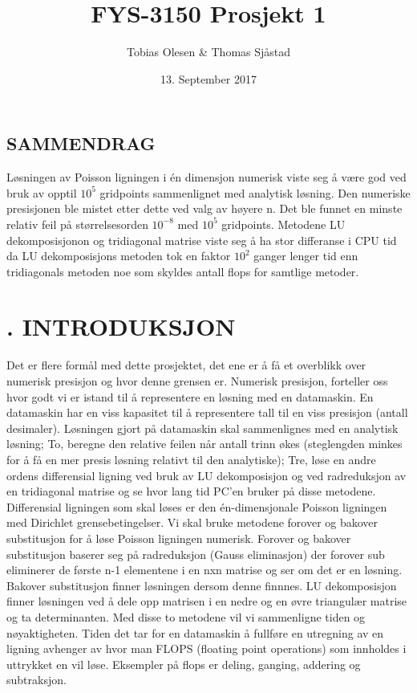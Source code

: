 \documentclass[twocolumn]{article}
\begin{document}
\title{\vspace{-2.5cm}FYS-3150 Prosjekt 1}
\author{Tobias Olesen & Thomas Sjåstad}
\date{13. September 2017}
\maketitle
\onecolumngrid
\noindent\makebox[\linewidth]{\rule{\paperwidth}{0.4pt}}
\begin{center}
\section*{SAMMENDRAG}
Løsningen av Poisson ligningen i én dimensjon numerisk viste seg å være god ved bruk av opptil $10^5$ gridpoints sammenlignet med analytisk løsning. Den numeriske presisjonen ble mistet etter dette ved valg av høyere n. Det ble funnet en minste relativ feil på størrelsesorden $10^{-8}$ med $10^5$ gridpoints. Metodene LU dekomposisjonon og tridiagonal matrise viste seg å ha stor differanse i CPU tid da LU dekomposisjons metoden tok en faktor $10^2$ ganger lenger tid enn tridiagonals metoden noe som skyldes antall flops for samtlige metoder.        
\end{center}  
\noindent\makebox[\linewidth]{\rule{\paperwidth}{0.4pt}}
\newline
\twocolumngrid
\section*{. INTRODUKSJON}
Det er flere formål med dette prosjektet, det ene er å få et overblikk over numerisk presisjon og hvor denne grensen er. Numerisk presisjon, forteller oss hvor godt vi er istand til å representere en løsning med en datamaskin. En datamaskin har en viss kapasitet til å representere tall til en viss presisjon (antall desimaler). Løsningen gjort på datamaskin skal sammenlignes med en analytisk løsning; To, beregne den relative feilen når antall trinn økes (steglengden minkes for å få en mer presis løsning relativt til den analytiske); Tre, løse en andre ordens differensial ligning ved bruk av LU dekomposisjon og ved radreduksjon av en tridiagonal matrise og se hvor lang tid PC'en bruker på disse metodene. Differensial ligningen som skal løses er den én-dimensjonale Poisson ligningen med Dirichlet grensebetingelser. Vi skal bruke metodene forover og bakover substitusjon for å løse Poisson ligningen numerisk. Forover og bakover substitusjon baserer seg på radreduksjon (Gauss eliminasjon) der forover sub eliminerer de første n-1 elementene i en nxn matrise og ser om det er en løsning. Bakover substitusjon finner løsningen dersom denne finnnes. LU dekomposisjon finner løsningen ved å dele opp matrisen i en nedre og en øvre triangulær matrise og ta determinanten. 
Med disse to metodene vil vi sammenligne tiden og nøyaktigheten. Tiden det tar for en datamaskin å fullføre en utregning av en ligning avhenger av hvor man FLOPS (floating point operations) som innholdes i uttrykket en vil løse. Eksempler på flops er deling, ganging, addering og subtraksjon.    
\end{document}
